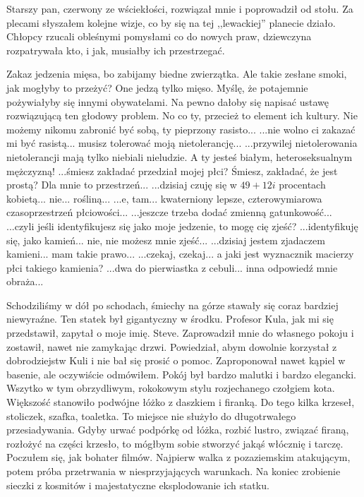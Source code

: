 Starszy pan, czerwony ze wściekłości, rozwiązał mnie i poprowadził od stołu. 
Za plecami słyszałem kolejne wizje, co by się na tej ,,lewackiej'' planecie działo.
Chłopcy rzucali obleśnymi pomysłami co do nowych praw, dziewczyna rozpatrywała kto, i jak, musiałby ich przestrzegać.
\begin{dialogue}
\ds{} Zakaz jedzenia mięsa, bo zabijamy biedne zwierzątka.
\ds{} Ale takie zesłane smoki, jak mogłyby to przeżyć? One jedzą tylko mięso.
\ds{} Myślę, że potajemnie pożywiałyby się innymi obywatelami.
\ds{} Na pewno dałoby się napisać ustawę rozwiązującą ten głodowy problem.
\ds{} No co ty, przecież to element ich kultury. Nie możemy nikomu zabronić być sobą, ty pieprzony rasisto...
\ds{} ...nie wolno ci zakazać mi być rasistą... musisz tolerować moją nietolerancję...
\ds{} ...przywilej nietolerowania nietolerancji mają tylko niebiali nieludzie. A ty jesteś białym, heteroseksualnym mężczyzną!
\ds{} ...śmiesz zakładać przedział mojej płci? Śmiesz, zakładać, że jest prostą? Dla mnie to przestrzeń...
\ds{} ...dzisiaj czuję się w $49 + 12i$ procentach kobietą... nie... rośliną...
\ds{} ...e, tam... kwaterniony lepsze, czterowymiarowa czasoprzestrzeń płciowości...
\ds{} ...jeszcze trzeba dodać zmienną gatunkowość...
\ds{} ...czyli jeśli identyfikujesz się jako moje jedzenie, to mogę cię zjeść?
\ds{} ...identyfikuję się, jako kamień... nie, nie możesz mnie zjeść...
\ds{} ...dzisiaj jestem zjadaczem kamieni... mam takie prawo...
\ds{} ...czekaj, czekaj... a jaki jest wyznacznik macierzy płci takiego kamienia?
\ds{} ...dwa do pierwiastka z cebuli... inna odpowiedź mnie obraża...
\end{dialogue}

Schodziliśmy w dół po schodach, śmiechy na górze stawały się coraz bardziej niewyraźne.
Ten statek był gigantyczny w środku. Profesor Kula, jak mi się przedstawił, zapytał o moje imię. Steve.
Zaprowadził mnie do własnego pokoju i zostawił, nawet nie zamykając drzwi. 
Powiedział, abym dowolnie korzystał z dobrodziejstw Kuli i nie bał się prosić o pomoc. 
Zaproponował nawet kąpiel w basenie, ale oczywiście odmówiłem.
Pokój był bardzo malutki i bardzo elegancki.
Wszytko w tym obrzydliwym, rokokowym stylu rozjechanego czołgiem kota.
Większość stanowiło podwójne łóżko z daszkiem i firanką.
Do tego kilka krzeseł, stoliczek, szafka, toaletka.
To miejsce nie służyło do długotrwałego przesiadywania.
Gdyby urwać podpórkę od łóżka, rozbić lustro, związać firaną, rozłożyć na części krzesło, to mógłbym sobie stworzyć jakąś włócznię i tarczę.
Poczułem się, jak bohater filmów. Najpierw walka z pozaziemskim atakującym, potem próba przetrwania w niesprzyjających warunkach.
Na koniec zrobienie sieczki z kosmitów i majestatyczne eksplodowanie ich statku.

